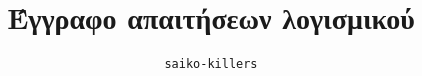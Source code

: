 \documentclass[]{NotebookToLatex}
\title{Έγγραφο απαιτήσεων λογισμικού}
\author{\texttt{saiko-killers}}
\begin{document}
	\maketitlepage
	\renewcommand*\contentsname{Περιεχόμενα}
	\tableofcontents

	\renewcommand{\listfigurename}{UML Διαγράμματα}
	\listoffigures
	\newpage
	
	\newpage
	
	\newpage
	
	\newpage
	
\end{document}
